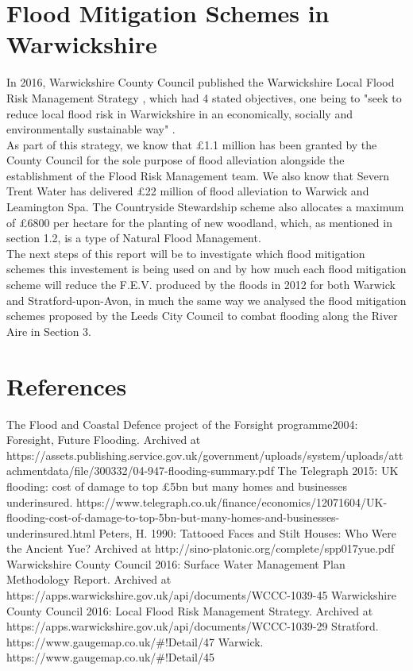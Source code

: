 \documentclass[11 pt, a4paper]{article}
\begin{document}
\newpage
\section{Flood Mitigation Schemes in Warwickshire}
In 2016, Warwickshire County Council published the Warwickshire Local Flood Risk Management Strategy \cite{5}, which had 4 stated objectives, one being to "seek to reduce local flood risk in Warwickshire in an economically, socially and environmentally sustainable way" \cite{5}. \\
As part of this strategy, we know that \pounds1.1 million has been granted by the County Council for the sole purpose of flood alleviation alongside the establishment of the Flood Risk Management team. We also know that Severn Trent Water has delivered \pounds22 million of flood alleviation to Warwick and Leamington Spa. The Countryside Stewardship scheme also allocates a maximum of \pounds6800 per hectare for the planting of new woodland, which, as mentioned in section 1.2, is a type of Natural Flood Management.\\
The next steps of this report will be to investigate which flood mitigation schemes this investement is being used on and by how much each flood mitigation scheme will reduce the F.E.V. produced by the floods in 2012 for both Warwick and Stratford-upon-Avon, in much the same way we analysed the flood mitigation schemes proposed by the Leeds City Council to combat flooding along the River Aire in Section 3.

\newpage
\section{References}
\begin{thebibliography}{}
The Flood and Coastal Defence project of the Forsight programme2004: Foresight, Future Flooding. Archived at https://assets.publishing.service.gov.uk/government/uploads/system/uploads/attachment\textunderscore data/file/300332/04-947-flooding-summary.pdf
The Telegraph 2015: UK flooding: cost of damage to top £5bn but many homes and businesses underinsured. https://www.telegraph.co.uk/finance/economics/12071604/UK-flooding-cost-of-damage-to-top-5bn-but-many-homes-and-businesses-underinsured.html
 Peters, H. 1990: Tattooed Faces and Stilt Houses: Who Were the Ancient Yue? Archived at http://sino-platonic.org/complete/spp017\textunderscore yue.pdf
Warwickshire County Council 2016: Surface Water Management Plan Methodology Report. Archived at https://apps.warwickshire.gov.uk/api/documents/WCCC-1039-45
Warwickshire County Council 2016: Local Flood Risk Management Strategy. Archived at https://apps.warwickshire.gov.uk/api/documents/WCCC-1039-29
Stratford. https://www.gaugemap.co.uk/\#!Detail/47
Warwick. https://www.gaugemap.co.uk/\#!Detail/45
\end{thebibliography}
\end{document}
